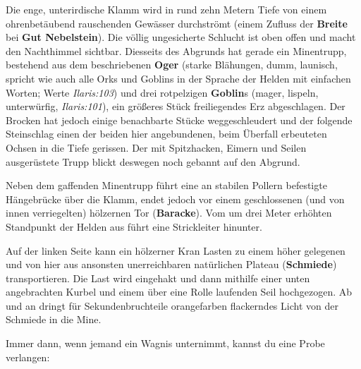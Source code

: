 
Die enge, unterirdische Klamm wird in rund zehn Metern Tiefe von einem ohrenbetäubend rauschenden Gewässer durchströmt (einem Zufluss der \textbf{Breite} bei \textbf{Gut Nebelstein}).
Die völlig ungesicherte Schlucht ist oben offen und macht den Nachthimmel sichtbar.
Diesseits des Abgrunds hat gerade ein Minentrupp, bestehend aus dem beschriebenen \textbf{Oger} (starke Blähungen, dumm, launisch, spricht wie auch alle Orks und Goblins in der Sprache der Helden mit einfachen Worten; Werte \emph{Ilaris:103}) und drei rotpelzigen \textbf{Goblin}s (mager, lispeln, unterwürfig, \emph{Ilaris:101}), ein größeres Stück freiliegendes Erz abgeschlagen.
Der Brocken hat jedoch einige benachbarte Stücke weggeschleudert und der folgende Steinschlag einen der beiden hier angebundenen, beim Überfall erbeuteten Ochsen in die Tiefe gerissen.
Der mit Spitzhacken, Eimern und Seilen ausgerüstete Trupp blickt deswegen noch gebannt auf den Abgrund.

Neben dem gaffenden Minentrupp führt eine an stabilen Pollern befestigte Hängebrücke über die Klamm, endet jedoch vor einem geschlossenen (und von innen verriegelten) hölzernen Tor (\textbf{Baracke}).
Vom um drei Meter erhöhten Standpunkt der Helden aus führt eine Strickleiter hinunter.

Auf der linken Seite kann ein hölzerner Kran Lasten zu einem höher gelegenen und von hier aus ansonsten unerreichbaren natürlichen Plateau (\textbf{Schmiede}) transportieren.
Die Last wird eingehakt und dann mithilfe einer unten angebrachten Kurbel und einem über eine Rolle laufenden Seil hochgezogen.
Ab und an dringt für Sekundenbruchteile orangefarben flackerndes Licht von der Schmiede in die Mine.

Immer dann, wenn jemand ein Wagnis unternimmt, kannst du eine Probe verlangen:

